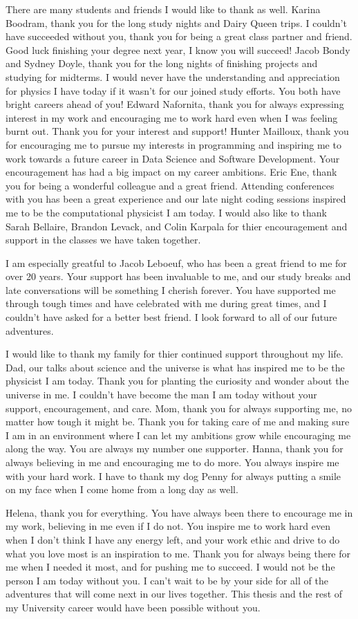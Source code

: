 \documentclass[12pt,oneside,final]{vlsithesis}
\begin{document}
{There are many students and friends I would like to thank as well. Karina Boodram, thank you for the long study nights and Dairy Queen trips. I couldn't have succeeded without you, thank you for being a great class partner and friend. Good luck finishing your degree next year, I know you will succeed! Jacob Bondy and Sydney Doyle, thank you for the long nights of finishing projects and studying for midterms. I would never have the understanding and appreciation for physics I have today if it wasn't for our joined study efforts. You both have bright careers ahead of you! Edward Nafornita, thank you for always expressing interest in my work and encouraging me to work hard even when I was feeling burnt out. Thank you for your interest and support! Hunter Mailloux, thank you for encouraging me to pursue my interests in programming and inspiring me to work towards a future career in Data Science and Software Development. Your encouragement has had a big impact on my career ambitions. Eric Ene, thank you for being a wonderful colleague and a great friend. Attending conferences with you has been a great experience and our late night coding sessions inspired me to be the computational physicist I am today. I would also like to thank Sarah Bellaire, Brandon Levack, and Colin Karpala for thier encouragement and support in the classes we have taken together. 

I am especially greatful to Jacob Leboeuf, who has been a great friend to me for over 20 years. Your support has been invaluable to me, and our study breaks and late conversations will be something I cherish forever. You have supported me through tough times and have celebrated with me during great times, and I couldn't have asked for a better best friend. I look forward to all of our future adventures.

I would like to thank my family for thier continued support throughout my life. Dad, our talks about science and the universe is what has inspired me to be the physicist I am today. Thank you for planting the curiosity and wonder about the universe in me. I couldn't have become the man I am today without your support, encouragement, and care. Mom, thank you for always supporting me, no matter how tough it might be. Thank you for taking care of me and making sure I am in an environment where I can let my ambitions grow while encouraging me along the way. You are always my number one supporter. Hanna, thank you for always believing in me and encouraging me to do more. You always inspire me with your hard work. I have to thank my dog Penny for always putting a smile on my face when I come home from a long day as well.

Helena, thank you for everything. You have always been there to encourage me in my work, believing in me even if I do not. You inspire me to work hard even when I don't think I have any energy left, and your work ethic and drive to do what you love most is an inspiration to me. Thank you for always being there for me when I needed it most, and for pushing me to succeed. I would not be the person I am today without you. I can't wait to be by your side for all of the adventures that will come next in our lives together. This thesis and the rest of my University career would have been possible without you.}
\end{document}
